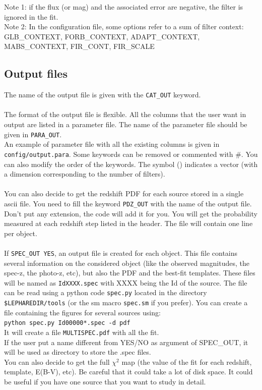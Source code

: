 \documentclass[12pt]{article}
\begin{document}
 Note 1: if the flux (or mag) and the associated error are negative, the filter is ignored in the fit.\\
 
 Note 2: In the configuration file, some options refer to a sum of  filter context:  \\
 GLB\_CONTEXT, FORB\_CONTEXT, ADAPT\_CONTEXT, MABS\_CONTEXT,
 FIR\_CONT, FIR\_SCALE  \\


\subsection{Output files}\label{output}

The name of the output file is given with the \texttt{CAT\_OUT} keyword. \\
\\
The format of the output file is flexible. All the columns that the user want in output are listed in a parameter file. The name of the parameter file should be given in \texttt{PARA\_OUT}. \\
An example of parameter file with all the existing columns is given in \texttt{config/output.para}. Some keywords can be removed or commented with \#. You can also modify the order of the keywords. The symbol () indicates a vector (with a dimension corresponding to the number of filters).\\ 
\\
You can also decide to get the redshift PDF for each source stored in a single ascii file. You need to fill the keyword  
\texttt{PDZ\_OUT} with the name of the output file. Don't put any extension, the code will add it for you. You will get the probability measured at each redshift step listed in the header. The file will contain one line per object. \\
\\
If \texttt{SPEC\_OUT YES}, an output file is created for each object. This file contains several information on the considered object (like the observed magnitudes, the spec-z, the photo-z, etc), but also the PDF and the best-fit templates. These files will be named as \texttt{IdXXXX.spec} with XXXX being the Id of the source. The file can be read using a python code \texttt{spec.py} located in the directory \texttt{\$LEPHAREDIR/tools} (or the sm macro \texttt{spec.sm} if you prefer).
You can create a file containing the figures for several sources using:\\
\texttt{python spec.py Id00000*.spec -d pdf}\\
It will create a file \texttt{MULTISPEC.pdf} with all the fit.\\
If the user put a name different from YES/NO as argument of SPEC\_OUT, it will be used as directory to store the .spec files.
\\
You can also decide to get the full $\chi^2$ map (the value of the fit for each redshift, template, E(B-V), etc). Be careful that it could take a lot of disk space. It could be useful if you have one source that you want to study in detail.
                          
\end{document}
